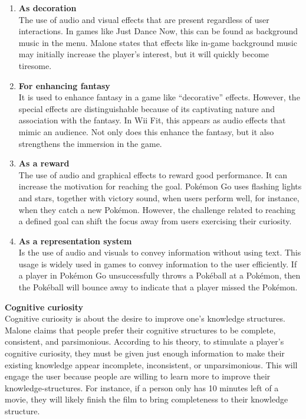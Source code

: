 \documentclass[../Main.tex]{subfiles}
\begin{document}
\begin{enumerate}
    \item \textbf{As decoration} \\
    The use of audio and visual effects that are present regardless of user interactions. In games like Just Dance Now, this can be found as background music in the menu. Malone states that effects like in-game background music may initially increase the player’s interest, but it will quickly become tiresome. 
    \item \textbf{For enhancing fantasy} \\
     It is used to enhance fantasy in a game like “decorative” effects. However, the special effects are distinguishable because of its captivating nature and association with the fantasy. In Wii Fit, this appears as audio effects that mimic an audience. Not only does this enhance the fantasy, but it also strengthens the immersion in the game.
    \item \textbf{As a reward} \\
    The use of audio and graphical effects to reward good performance. It can increase the motivation for reaching the goal. Pokémon Go uses flashing lights and stars, together with victory sound, when users perform well, for instance, when they catch a new Pokémon. However, the challenge related to reaching a defined goal can shift the focus away from users exercising their curiosity. 
    \item \textbf{As a representation system} \\
    Is the use of audio and visuals to convey information without using text. This usage is widely used in games to convey information to the user efficiently. If a player in Pokémon Go unsuccessfully throws a Pokéball at a Pokémon, then the Pokéball will bounce away to indicate that a player missed the Pokémon.  
\end{enumerate}

\textbf{Cognitive curiosity} \\
Cognitive curiosity is about the desire to improve one’s knowledge structures. Malone claims that people prefer their cognitive structures to be complete, consistent, and parsimonious. According to his theory, to stimulate a player’s cognitive curiosity, they must be given just enough information to make their existing knowledge appear incomplete, inconsistent, or unparsimonious. This will engage the user because people are willing to learn more to improve their knowledge-structures. For instance, if a person only has 10 minutes left of a movie, they will likely finish the film to bring completeness to their knowledge structure.
\end{document}
